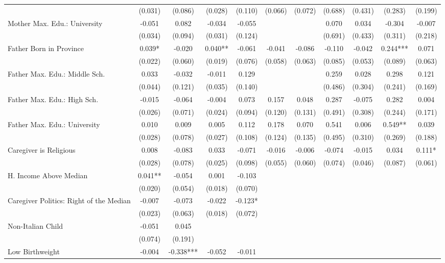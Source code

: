 \begin{tabular}{lcccccccccc}
 & (0.031) & (0.086) & (0.028) & (0.110) & (0.066) & (0.072) & (0.688) & (0.431) & (0.283) & (0.199) \\
Mother Max. Edu.: University & -0.051 & 0.082 & -0.034 & -0.055 &  &  & 0.070 & 0.034 & -0.304 & -0.007 \\
 & (0.034) & (0.094) & (0.031) & (0.124) &  &  & (0.691) & (0.433) & (0.311) & (0.218) \\
Father Born in Province & 0.039* & -0.020 & 0.040** & -0.061 & -0.041 & -0.086 & -0.110 & -0.042 & 0.244*** & 0.071 \\
 & (0.022) & (0.060) & (0.019) & (0.076) & (0.058) & (0.063) & (0.085) & (0.053) & (0.089) & (0.063) \\
Father Max. Edu.: Middle Sch. & 0.033 & -0.032 & -0.011 & 0.129 &  &  & 0.259 & 0.028 & 0.298 & 0.121 \\
 & (0.044) & (0.121) & (0.035) & (0.140) &  &  & (0.486) & (0.304) & (0.241) & (0.169) \\
Father Max. Edu.: High Sch. & -0.015 & -0.064 & -0.004 & 0.073 & 0.157 & 0.048 & 0.287 & -0.075 & 0.282 & 0.004 \\
 & (0.026) & (0.071) & (0.024) & (0.094) & (0.120) & (0.131) & (0.491) & (0.308) & (0.244) & (0.171) \\
Father Max. Edu.: University & 0.010 & 0.009 & 0.005 & 0.112 & 0.178 & 0.070 & 0.541 & 0.006 & 0.549** & 0.039 \\
 & (0.028) & (0.078) & (0.027) & (0.108) & (0.124) & (0.135) & (0.495) & (0.310) & (0.269) & (0.188) \\
Caregiver is Religious & 0.008 & -0.083 & 0.033 & -0.071 & -0.016 & -0.006 & -0.074 & -0.015 & 0.034 & 0.111* \\
 & (0.028) & (0.078) & (0.025) & (0.098) & (0.055) & (0.060) & (0.074) & (0.046) & (0.087) & (0.061) \\
H. Income Above Median & 0.041** & -0.054 & 0.001 & -0.103 &  &  &  &  &  &  \\
 & (0.020) & (0.054) & (0.018) & (0.070) &  &  &  &  &  &  \\
Caregiver Politics: Right of the Median & -0.007 & -0.073 & -0.022 & -0.123* &  &  &  &  &  &  \\
 & (0.023) & (0.063) & (0.018) & (0.072) &  &  &  &  &  &  \\
Non-Italian Child & -0.051 & 0.045 &  &  &  &  &  &  &  &  \\
 & (0.074) & (0.191) &  &  &  &  &  &  &  &  \\
Low Birthweight & -0.004 & -0.338*** & -0.052 & -0.011 &  &  &  &  &  &  \\

\end{tabular}

